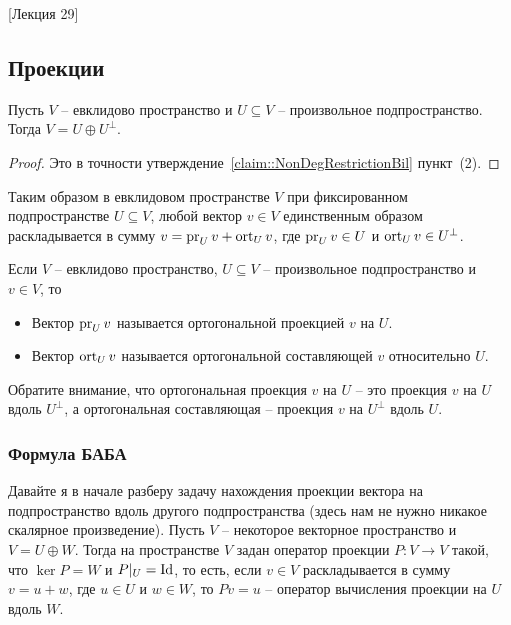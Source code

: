 [Лекция 29]


\subsection{Проекции}
\label{section::OrthoProjection}

\begin{claim}
Пусть $V$ -- евклидово пространство и $U\subseteq V$ -- произвольное подпространство.
Тогда $V = U\oplus U^\bot$.
\end{claim}
\begin{proof}
Это в точности утверждение~\ref{claim::NonDegRestrictionBil} пункт~(2).
\end{proof}

Таким образом в евклидовом пространстве $V$ при фиксированном подпространстве $U\subseteq V$, любой вектор $v\in V$ единственным образом раскладывается в сумму $v = \operatorname{pr}_U v + \operatorname{ort}_U v$, где $\operatorname{pr}_U v \in U$ и $\operatorname{ort}_U v\in U^\bot$.

\begin{definition}
Если $V$ -- евклидово пространство, $U\subseteq V$ -- произвольное подпространство и $v\in V$, то 
\begin{itemize}
\item Вектор $\operatorname{pr}_U v$ называется ортогональной проекцией $v$ на $U$.

\item Вектор $\operatorname{ort}_U v$ называется ортогональной составляющей $v$ относительно $U$.
\end{itemize}
\end{definition}

Обратите внимание, что ортогональная проекция $v$ на $U$ -- это проекция $v$ на $U$ вдоль $U^\bot$, а ортогональная составляющая -- проекция $v$ на $U^\bot$ вдоль $U$.

\subsubsection*{Формула БАБА}

Давайте я в начале разберу задачу нахождения проекции вектора на подпространство вдоль другого подпространства (здесь нам не нужно никакое скалярное произведение).
Пусть $V$ -- некоторое векторное пространство и $V = U\oplus W$.
Тогда на пространстве $V$ задан оператор проекции $P\colon V\to V$ такой, что $\ker P = W$ и $P|_U = \operatorname{Id}$, то есть, если $v\in V$ раскладывается в сумму $v = u + w$, где $u\in U$ и $w\in W$, то $Pv = u$ -- оператор вычисления проекции на $U$ вдоль $W$.


